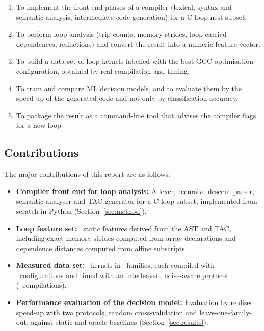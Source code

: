 \documentclass[12pt,a4paper]{article}
\begin{document}
\begin{enumerate}
    \item To implement the front-end phases of a compiler (lexical, syntax and
    semantic analysis, intermediate code generation) for a C loop-nest subset.

    \item To perform loop analysis (trip counts, memory strides, loop-carried
    dependences, reductions) and convert the result into a numeric feature
    vector.

    \item To build a data set of loop kernels labelled with the best GCC
    optimisation configuration, obtained by real compilation and timing.

    \item To train and compare ML decision models, and to evaluate them by the
    speed-up of the generated code and not only by classification accuracy.

    \item To package the result as a command-line tool that advises the
    compiler flags for a new loop.
\end{enumerate}

\subsection{Contributions}

The major contributions of this report are as follows:

\begin{itemize}
    \item \textbf{Compiler front end for loop analysis:}
    A lexer, recursive-descent parser, semantic analyser and TAC generator for
    a C loop subset, implemented from scratch in Python
    (Section~\ref{sec:method}).

    \item \textbf{Loop feature set:}
    \numFeatures\ static features derived from the AST and TAC, including
    exact memory strides computed from array declarations and
    dependence distances computed from affine subscripts.

    \item \textbf{Measured data set:}
    \numKernels\ kernels in \numFamilies\ families, each compiled with
    \numConfigs\ configurations and timed with an interleaved, noise-aware
    protocol (\numCompiles\ compilations).

    \item \textbf{Performance evaluation of the decision model:}
    Evaluation by realised speed-up with two protocols, random cross-validation
    and leave-one-family-out, against static and oracle baselines
    (Section~\ref{sec:results}).
\end{itemize}
\end{document}
